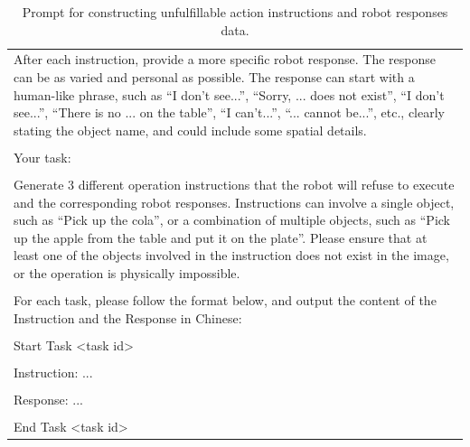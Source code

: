 \begin{table}[h!]
\begin{minipage}{0.99\columnwidth}
\begin{tcolorbox}
\begin{tabular}{p{}}
After each instruction, provide a more specific robot response. The response can be as varied and personal as possible. The response can start with a human-like phrase, such as ``I don't see...'', ``Sorry, ... does not exist'', ``I don't see...'', ``There is no ... on the table'', ``I can't...'', ``... cannot be...'', etc., clearly stating the object name, and could include some spatial details. \\
\\
Your task: \\
\\
Generate 3 different operation instructions that the robot will refuse to execute and the corresponding robot responses. Instructions can involve a single object, such as ``Pick up the cola'', or a combination of multiple objects, such as ``Pick up the apple from the table and put it on the plate''. Please ensure that at least one of the objects involved in the instruction does not exist in the image, or the operation is physically impossible. \\
\\
For each task, please follow the format below, and output the content of the Instruction and the Response in Chinese: \\
\\
Start Task \textless task id\textgreater \\
\\
Instruction: ... \\
\\
Response: ... \\
\\
End Task \textless task id\textgreater
    \end{tabular}
\end{tcolorbox}
\vspace{-2mm}
\caption{Prompt for constructing unfulfillable action instructions and robot responses data.}
    \label{tab:prompt2}
\end{minipage}
\end{table}

